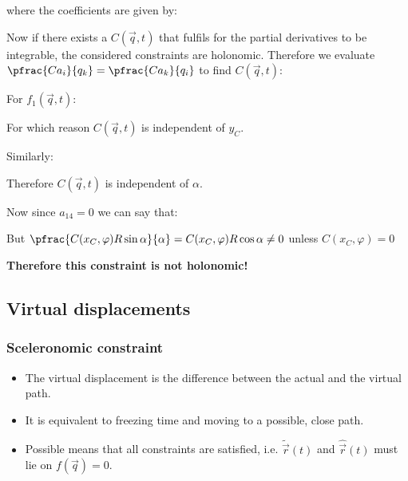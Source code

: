 \documentclass[10pt,a4paper]{scrartcl}
\begin{document}
\begin{multicols*}{2}
where the coefficients are given by:


Now if there exists a $C(\vec{q},t)$ that fulfils for the partial derivatives to be integrable, the considered constraints are holonomic. Therefore we evaluate $\pfrac{Ca_i}{q_k}=\pfrac{Ca_k}{q_i}$ to find $C(\vec{q},t)$:

For $f_1(\vec{q},t)$:


For which reason $C(\vec{q},t)$ is independent of $y_C$.

Similarly:


Therefore $C(\vec{q},t)$ is independent of $\alpha$.

Now since $a_{14}=0$ we can say that:


But $\pfrac{C(x_C,\varphi)R\sin\alpha}{\alpha}= C(x_C,\varphi)R\cos\alpha\neq0$ unless $C(x_C,\varphi)=0$

\textbf{Therefore this constraint is not holonomic!}

\subsection{Virtual displacements}
\subsubsection{Sceleronomic constraint}
\begin{itemize}
\item The virtual displacement is the difference between the actual and the virtual path.
\item It is equivalent to freezing time and moving to a possible, close path.
\item Possible means that all constraints are satisfied, i.e. $\tilde{\vec{r}}(t)$ and $\hat{\vec{r}}(t)$  must lie on $f(\vec{q})=0$.


\end{itemize}
\end{multicols*}
\end{document}
